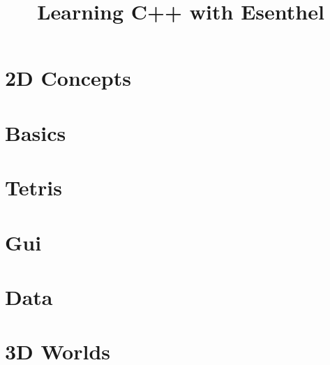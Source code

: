 \documentclass[11pt, oldfontcommands, oneside, a4paper]{memoir}
\title{Learning C++ with Esenthel}
\begin{document}
\titleGM
\tableofcontents

%

\part{2D Concepts}






\part{Basics}











\part{Tetris}






\part{Gui}








\part{Data}







\part{3D Worlds}







\printindex
\end{document}
